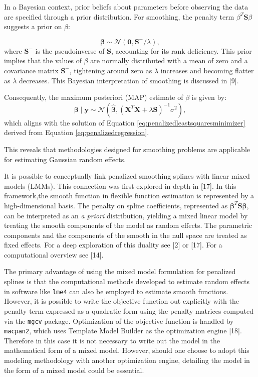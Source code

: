 \documentclass[
11pt, %
oneside, %
english, %
singlespacing, %
]{macthesis} %
\begin{document}
In a Bayesian context, prior beliefs about parameters before observing the data are specified through a prior distribution. For smoothing, the penalty term \(\beta^T \mathbf{S} \beta\) suggests a prior on \(\beta\):

\begin{equation}
\mathbf{\beta} \sim \mathcal{N}(\mathbf{0}, \mathbf{S}^{-}/\lambda),
\label{eq:penalty prior}
\end{equation}
where \(\mathbf{S}^{-}\) is the pseudoinverse of \(\mathbf{S}\), accounting for its rank deficiency. This prior implies that the values of \(\beta\) are normally distributed with a mean of zero and a covariance matrix \(\mathbf{S}^{-}\), tightening around zero as \(\lambda\) increases and becoming flatter as \(\lambda\) decreases. This Bayesian interpretation of smoothing is discussed in {[}9{]}.

Consequently, the maximum posteriori (MAP) estimate of \(\beta\) is given by:
\begin{equation}
\mathbf{\beta} \mid \mathbf{y} \sim \mathcal{N}(\hat{\mathbf{\beta}}, (\mathbf{X}^T \mathbf{X} + \lambda \mathbf{S})^{-1} \sigma^2),
\label{eq:MAP estimate}
\end{equation}
which aligns with the solution of Equation \ref{eq:penalizedleastsquaresminimizer} derived from Equation \ref{eq:penalizedregression}.

This reveals that methodologies designed for smoothing problems are applicable for estimating Gaussian random effects.

It is possible to conceptually link penalized smoothing splines with linear mixed models (LMMs). This connection was first explored in-depth in {[}17{]}. In this framework,the smooth function in flexible function estimation is represented by a high-dimensional basis. The penalty on spline coefficients, represented as \(\mathbf{\beta}^T \mathbf{S} \mathbf{\beta}\), can be interpreted as an \emph{a priori} distribution, yielding a mixed linear model by treating the smooth components of the model as random effects. The parametric components and the components of the smooth in the null space are treated as fixed effects. For a deep exploration of this duality see {[}2{]} or {[}17{]}. For a computational overview see {[}14{]}.

The primary advantage of using the mixed model formulation for penalized splines is that the computational methods developed to estimate random effects in software like \texttt{lme4} can also be employed to estimate smooth functions. However, it is possible to write the objective function out explicitly with the penalty term expressed as a quadratic form using the penalty matrices computed via the \texttt{mgcv} package. Optimization of the objective function is handled by \texttt{macpan2}, which uses Template Model Builder as the optimization engine {[}18{]}. Therefore in this case it is not necessary to write out the model in the mathematical form of a mixed model. However, should one choose to adopt this modeling methodology with another optimization engine, detailing the model in the form of a mixed model could be essential.
\end{document}

